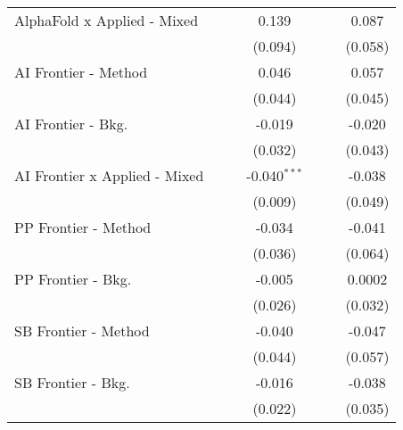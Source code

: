 \begin{tabular}{lcccccc}
   AlphaFold x Applied - Mixed   &               &             & 0.139          &               &               & 0.087\\   
                                 &               &             & (0.094)        &               &               & (0.058)\\   
   AI Frontier - Method          &               &             & 0.046          &               &               & 0.057\\   
                                 &               &             & (0.044)        &               &               & (0.045)\\   
   AI Frontier - Bkg.            &               &             & -0.019         &               &               & -0.020\\   
                                 &               &             & (0.032)        &               &               & (0.043)\\   
   AI Frontier x Applied - Mixed &               &             & -0.040$^{***}$ &               &               & -0.038\\   
                                 &               &             & (0.009)        &               &               & (0.049)\\   
   PP Frontier - Method          &               &             & -0.034         &               &               & -0.041\\   
                                 &               &             & (0.036)        &               &               & (0.064)\\   
   PP Frontier - Bkg.            &               &             & -0.005         &               &               & 0.0002\\   
                                 &               &             & (0.026)        &               &               & (0.032)\\   
   SB Frontier - Method          &               &             & -0.040         &               &               & -0.047\\   
                                 &               &             & (0.044)        &               &               & (0.057)\\   
   SB Frontier - Bkg.            &               &             & -0.016         &               &               & -0.038\\   
                                 &               &             & (0.022)        &               &               & (0.035)\\   

\end{tabular}
